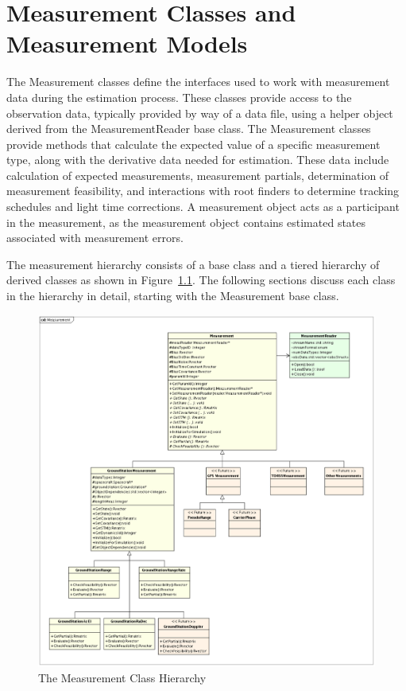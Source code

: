 \chapter{Measurement Classes and Measurement Models}


The Measurement classes define the interfaces used to work with measurement data during the estimation process.  These classes provide access to the observation data, typically provided by way of a data file, using a helper object derived from the MeasurementReader base class.  The Measurement classes provide methods that calculate the expected value of a specific measurement type, along with the derivative data needed for estimation.  These data include calculation of expected measurements, measurement partials, determination of measurement feasibility, and interactions with root finders to determine tracking schedules and light time corrections.  A measurement object acts as a participant in the measurement, as the measurement object contains estimated states associated with measurement errors.

The measurement hierarchy consists of a base class and a tiered hierarchy of derived classes as shown in Figure~\ref{fig:MeasurementClasses}.  The following sections discuss each class in the hierarchy in detail, starting with the Measurement base class.

\begin{figure}[htbp]
\begin{center}
\includegraphics[scale=0.43]{Images/MeasurementClasses.eps}
\caption{\label{fig:MeasurementClasses}The Measurement Class Hierarchy}
\end{center}
\end{figure}

